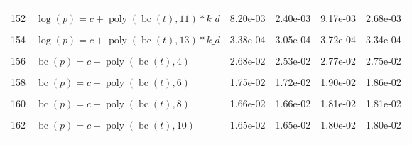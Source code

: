 \documentclass[12pt,a4paper]{article}
\DeclareMathOperator{\bc}{bc}
\DeclareMathOperator{\poly}{poly}
\begin{document}
\begin{longtable}[t]{ll>{\raggedleft\arraybackslash}p{2cm}>{\raggedleft\arraybackslash}p{2cm}>{\raggedleft\arraybackslash}p{2cm}>{\raggedleft\arraybackslash}p{2cm}}
\cellcolor{gray!6}{151} & \cellcolor{gray!6}{$\log(p) = c + \poly\left( \bc(t), 10 \right) * k\_d$} & \cellcolor{gray!6}{1.68e-02} & \cellcolor{gray!6}{7.51e-03} & \cellcolor{gray!6}{1.87e-02} & \cellcolor{gray!6}{8.35e-03}\\
152 & $\log(p) = c + \poly\left( \bc(t), 11 \right) * k\_d$ & 8.20e-03 & 2.40e-03 & 9.17e-03 & 2.68e-03\\
\cellcolor{gray!6}{153} & \cellcolor{gray!6}{$\log(p) = c + \poly\left( \bc(t), 12 \right) * k\_d$} & \cellcolor{gray!6}{7.66e-04} & \cellcolor{gray!6}{6.42e-04} & \cellcolor{gray!6}{8.52e-04} & \cellcolor{gray!6}{7.13e-04}\\
154 & $\log(p) = c + \poly\left( \bc(t), 13 \right) * k\_d$ & 3.38e-04 & 3.05e-04 & 3.72e-04 & 3.34e-04\\
\cellcolor{gray!6}{155} & \cellcolor{gray!6}{$\bc(p) = c + \poly\left( \bc(t), 3 \right)$} & \cellcolor{gray!6}{4.22e-02} & \cellcolor{gray!6}{2.28e-02} & \cellcolor{gray!6}{2.47e-02} & \cellcolor{gray!6}{2.44e-02}\\
156 & $\bc(p) = c + \poly\left( \bc(t), 4 \right)$ & 2.68e-02 & 2.53e-02 & 2.77e-02 & 2.75e-02\\
\cellcolor{gray!6}{157} & \cellcolor{gray!6}{$\bc(p) = c + \poly\left( \bc(t), 5 \right)$} & \cellcolor{gray!6}{1.87e-02} & \cellcolor{gray!6}{1.82e-02} & \cellcolor{gray!6}{1.95e-02} & \cellcolor{gray!6}{1.95e-02}\\
158 & $\bc(p) = c + \poly\left( \bc(t), 6 \right)$ & 1.75e-02 & 1.72e-02 & 1.90e-02 & 1.86e-02\\
\cellcolor{gray!6}{159} & \cellcolor{gray!6}{$\bc(p) = c + \poly\left( \bc(t), 7 \right)$} & \cellcolor{gray!6}{1.76e-02} & \cellcolor{gray!6}{1.72e-02} & \cellcolor{gray!6}{1.91e-02} & \cellcolor{gray!6}{1.87e-02}\\
160 & $\bc(p) = c + \poly\left( \bc(t), 8 \right)$ & 1.66e-02 & 1.66e-02 & 1.81e-02 & 1.81e-02\\
\cellcolor{gray!6}{161} & \cellcolor{gray!6}{$\bc(p) = c + \poly\left( \bc(t), 9 \right)$} & \cellcolor{gray!6}{1.66e-02} & \cellcolor{gray!6}{1.66e-02} & \cellcolor{gray!6}{1.81e-02} & \cellcolor{gray!6}{1.81e-02}\\
162 & $\bc(p) = c + \poly\left( \bc(t), 10 \right)$ & 1.65e-02 & 1.65e-02 & 1.80e-02 & 1.80e-02\\
\cellcolor{gray!6}{163} & \cellcolor{gray!6}{$\bc(p) = c + \poly\left( \bc(t), 11 \right)$} & \cellcolor{gray!6}{1.65e-02} & \cellcolor{gray!6}{1.65e-02} & \cellcolor{gray!6}{1.80e-02} & \cellcolor{gray!6}{1.80e-02}\\

\end{longtable}
\end{document}
